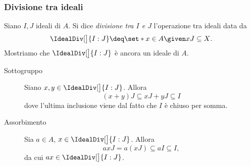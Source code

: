 \subsubsection{Divisione tra ideali}

Siano $I, J$ ideali di $A$. Si dice \emph{divisione tra $I$ e $J$} l'operazione tra ideali data da \[
    \IdealDiv[\big]{I:J} \deq \set*{x \in A \given xJ \subseteq X}.    
\] Mostriamo che $\IdealDiv[\big]{I:J}$ è ancora un ideale di $A$.
\begin{description}
    \item[Sottogruppo] Siano $x, y \in \IdealDiv[\big]{I:J}$. Allora \[
        (x+y)J \subseteq xJ + yJ \subseteq I    
    \] dove l'ultima inclusione viene dal fatto che $I$ è chiuso per somma.
    \item[Assorbimento] Sia $a \in A$, $x \in \IdealDiv[\big]{I:J}$. Allora \[
        axJ = a(xJ) \subseteq aI \subseteq I,    
    \] da cui $ax \in \IdealDiv[\big]{I:J}$.
\end{description}